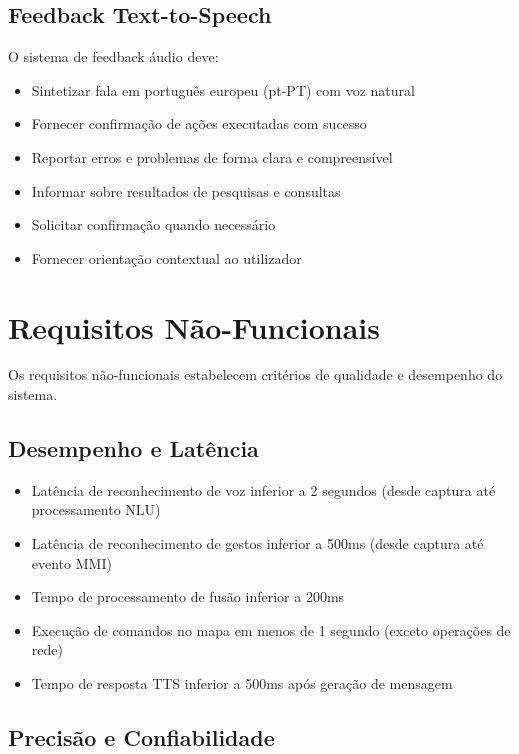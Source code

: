 \subsection{Feedback Text-to-Speech}

O sistema de feedback áudio deve:

\begin{itemize}
    \item Sintetizar fala em português europeu (pt-PT) com voz natural
    \item Fornecer confirmação de ações executadas com sucesso
    \item Reportar erros e problemas de forma clara e compreensível
    \item Informar sobre resultados de pesquisas e consultas
    \item Solicitar confirmação quando necessário
    \item Fornecer orientação contextual ao utilizador
\end{itemize}

\section{Requisitos Não-Funcionais}

Os requisitos não-funcionais estabelecem critérios de qualidade e desempenho do sistema.

\subsection{Desempenho e Latência}

\begin{itemize}
    \item Latência de reconhecimento de voz inferior a 2 segundos (desde captura até processamento NLU)
    \item Latência de reconhecimento de gestos inferior a 500ms (desde captura até evento MMI)
    \item Tempo de processamento de fusão inferior a 200ms
    \item Execução de comandos no mapa em menos de 1 segundo (exceto operações de rede)
    \item Tempo de resposta TTS inferior a 500ms após geração de mensagem
\end{itemize}

\subsection{Precisão e Confiabilidade}

